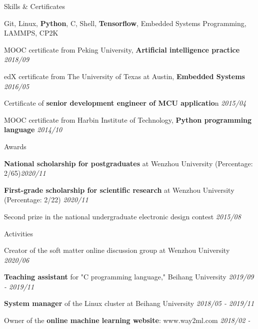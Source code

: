 \documentclass{resume} %
\begin{document}
\begin{rSection}{Skills \& Certificates}
\begin{rSubsection}{}{}{}{}
	\item Git, Linux, \textbf{Python}, C, Shell, \textbf{Tensorflow}, Embedded Systems Programming, LAMMPS, CP2K
	\item MOOC certificate from Peking University, \textbf{Artificial intelligence practice} \hfill  \textit{2018/09}
	\item edX certificate from The University of Texas at Austin, \textbf{Embedded Systems}  \hfill \textit{2016/05}
	\item Certificate of \textbf{senior development engineer of MCU applicatio}n  \hfill \textit{2015/04}
	\item MOOC certificate from Harbin Institute of Technology, \textbf{Python programming language} \hfill \textit{2014/10}
\end{rSubsection}
\end{rSection}


\begin{rSection}{Awards}
	\begin{rSubsection}{}{}{}{}
		\item \textbf{National scholarship for postgraduates} at Wenzhou University (Percentage: 2/65)\hfill \textit{2020/11}
		\item \textbf{First-grade scholarship for scientific research} at Wenzhou University (Percentage: 2/22) \hfill \textit{2020/11}
		\item Second prize in the national undergraduate electronic design contest \hfill \textit{2015/08}
	\end{rSubsection}
\end{rSection}

\begin{rSection}{Activities}
	\begin{rSubsection}{}{}{}{}
		\item Creator of the soft matter online discussion group at Wenzhou University \hfill \textit{2020/06} 
		\item \textbf{Teaching assistant }for  "C programming language," Beihang University \hfill \textit{2019/09 - 2019/11}
		\item \textbf{System manager} of the Linux cluster at Beihang University \hfill \textit{2018/05 - 2019/11}
		\item Owner of the \textbf{online machine learning website}: www.way2ml.com \hfill \textit{2018/02 -}
	\end{rSubsection}
\end{rSection}
\end{document}
